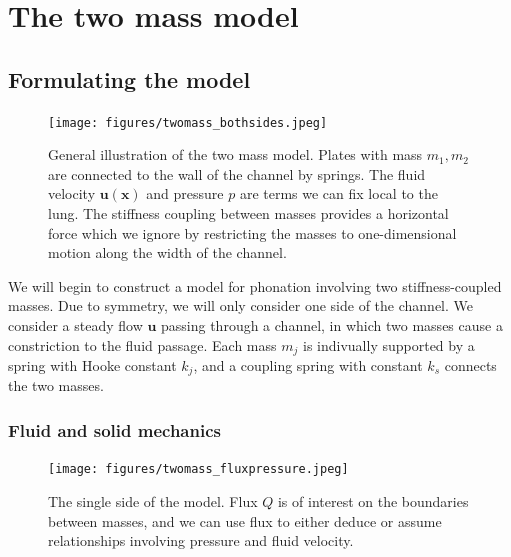 


%


\chapter{The two mass model}
\label{cha:twomass}

\section{Formulating the model}

\begin{figure}[h!]
    \centering
    \texttt{[image: figures/twomass\_bothsides.jpeg]}
    \caption{General illustration of the two mass model. Plates with mass ${m_1},{m_2}$ are connected to the wall of the channel by springs.
    The fluid velocity $\bm{u(x)}$ and pressure $p$ are terms we can fix local to the lung.
    The stiffness coupling between masses provides a horizontal force which we ignore by restricting the masses to one-dimensional motion along the width of the channel.}
    \label{fig:twomass_bothsides}
\end{figure}

We will begin to construct a model for phonation involving two stiffness-coupled masses.
Due to symmetry, we will only consider one side of the channel.
We consider a steady flow $\mathbf{u}$ passing through a channel,
in which two masses cause a constriction to the fluid passage.
Each mass $m_j$ is indivually supported by a spring with Hooke constant $k_j$,
and a coupling spring with constant $k_s$ connects the two masses.

\subsection{Fluid and solid mechanics}

\begin{figure}[h!]
	\centering
	\texttt{[image: figures/twomass\_fluxpressure.jpeg]}
	\caption{The single side of the model.
		Flux $Q$ is of interest on the boundaries between masses,
		and we can use flux to either deduce or assume relationships involving pressure and fluid velocity.
	}
	\label{fig:twomass_fluxpressure}
\end{figure}

